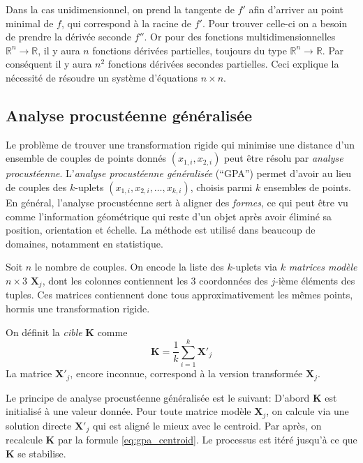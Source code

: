 \documentclass[a4paper,10pt]{scrreprt}
\begin{document}
Dans la cas unidimensionnel, on prend la tangente de $f'$ afin d'arriver au point minimal de $f$, qui correspond à la racine de $f'$. Pour trouver celle-ci on a besoin de prendre la dérivée seconde $f''$. Or pour des fonctions multidimensionnelles $\mathbb{R}^n \rightarrow \mathbb{R}$, il y aura $n$ fonctions dérivées partielles, toujours du type $\mathbb{R}^n \rightarrow \mathbb{R}$. Par conséquent il y aura $n^2$ fonctions dérivées secondes partielles. Ceci explique la nécessité de résoudre un système d'équations $n \times n$.

\subsection{Analyse procustéenne généralisée} \label{sec:procust}
Le problème de trouver une transformation rigide qui minimise une distance d'un ensemble de couples de points donnés ${(x_{1,i}, x_{2,i})}$ peut être résolu par \emph{analyse procustéenne}. L'\emph{analyse procustéenne généralisée} (``GPA'') permet d'avoir au lieu de couples des $k$-uplets ${(x_{1,i}, x_{2,i}, \ldots, x_{k,i})}$, choisis parmi $k$ ensembles de points. En général, l'analyse procustéenne sert à aligner des \emph{formes}, ce qui peut être vu comme l'information géométrique qui reste d'un objet après avoir éliminé sa position, orientation et échelle. La méthode est utilisé dans beaucoup de domaines, notamment en statistique.

Soit $n$ le nombre de couples. On encode la liste des $k$-uplets via $k$ \emph{matrices modèle} $n \times 3$ $\mathbf{X}_j$, dont les colonnes contiennent les $3$ coordonnées des $j$-ième éléments des tuples. Ces matrices contiennent donc tous approximativement les mêmes points, hormis une transformation rigide.

On définit la \emph{cible} $\mathbf{K}$ comme
\begin{equation} \label{eq:gpa_centroid}
	\mathbf{K} = \frac{1}{k} \sum_{i=1}^{k} \mathbf{X'}_j 
\end{equation}
La matrice $\mathbf{X'}_j$, encore inconnue, correspond à la version transformée $\mathbf{X}_j$.

Le principe de analyse procustéenne généralisée est le suivant: D'abord $\mathbf{K}$ est initialisé à une valeur donnée. Pour toute matrice modèle $\mathbf{X}_j$, on calcule via une solution directe $\mathbf{X'}_j$ qui est aligné le mieux avec le centroid. Par après, on recalcule $\mathbf{K}$ par la formule \ref{eq:gpa_centroid}. Le processus est itéré jusqu'à ce que $\mathbf{K}$ se stabilise. \cite{Told2010}
\end{document}
